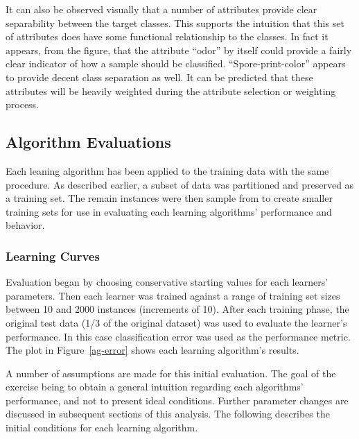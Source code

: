 \documentclass{sig-alternate}
\begin{document}
It can also be observed visually that a number of attributes provide clear separability between the target classes. This supports the intuition that this set of attributes does have some functional relationship to the classes. In fact it appears, from the figure, that the attribute ``odor'' by itself could provide a fairly clear indicator of how a sample should be classified. ``Spore-print-color'' appears to provide decent class separation as well. It can be predicted that these attributes will be heavily weighted during the attribute selection or weighting process.

\subsection{Algorithm Evaluations}

Each leaning algorithm has been applied to the training data with the same procedure. As described earlier, a subset of data was partitioned and preserved as a training set. The remain instances were then sample from to create smaller training sets for use in evaluating each learning algorithms' performance and behavior.


\subsubsection{Learning Curves}

Evaluation began by choosing conservative starting values for each learners' parameters. Then each learner was trained against a range of training set sizes between 10 and 2000 instances (increments of 10). After each training phase, the original test data (1/3 of the original dataset) was used to evaluate the learner's performance. In this case classification error was used as the performance metric. The plot in Figure~\ref{ag-error} shows each learning algorithm's results.

A number of assumptions are made for this initial evaluation. The goal of the exercise being to obtain a general intuition regarding each algorithms' performance, and not to present ideal conditions. Further parameter changes are discussed in subsequent sections of this analysis. The following describes the initial conditions for each learning algorithm.
\end{document}
